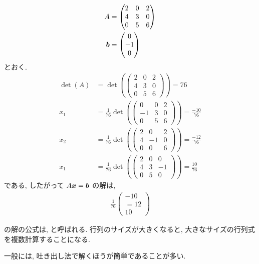 \begin{example}
  \begin{align*}
    A&=
    \begin{pmatrix}
      2&0&2\\
      4&3&0\\
      0&5&6
    \end{pmatrix}\\
    \boldsymbol{b}
    &=
    \begin{pmatrix}
      0\\
      -1\\
      0
    \end{pmatrix}
  \end{align*}
  とおく.
  \begin{align*}
    \det(A)&=\det(
    \begin{pmatrix}
      2&0&2\\
      4&3&0\\
      0&5&6
    \end{pmatrix})=76\\
    x_1&=\frac{1}{76}\det(
    \begin{pmatrix}
      0&0&2\\
      -1&3&0\\
      0&5&6
    \end{pmatrix})=\frac{-10}{76}\\
    x_2&=\frac{1}{76}\det(
    \begin{pmatrix}
      2&0&2\\
      4&-1&0\\
      0&0&6
    \end{pmatrix})=\frac{-12}{76}\\
    x_1&=\frac{1}{76}\det(
    \begin{pmatrix}
      2&0&0\\
      4&3&-1\\
      0&5&0
    \end{pmatrix})=\frac{10}{76}
  \end{align*}
  である, したがって
  $A\boldsymbol{x}=\boldsymbol{b}$
  の解は,
  \begin{align*}
    \frac{1}{76}
    \begin{pmatrix}
-10\\=12\\10
    \end{pmatrix}
  \end{align*}
\end{example}
\begin{remark}
  の解の公式は,
  と呼ばれる.
  行列のサイズが大きくなると,
  大きなサイズの行列式を複数計算することになる.

  一般には, 吐き出し法で解くほうが簡単であることが多い.
\end{remark}


